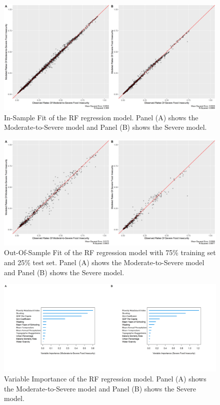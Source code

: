 \documentclass{article}
\begin{document}

\begin{figure}[H]
  \centering
  \includegraphics[width=\linewidth]{img/model/in-sample_rf.png}
  \caption{In-Sample Fit of the RF regression model. Panel (A) shows the Moderate-to-Severe model and Panel (B) shows the Severe model.}
  \label{fig:rf_in-sample}
\end{figure}

\begin{figure}[H]
  \centering
  \includegraphics[width=\linewidth]{img/model/out-sample_rf.png}
  \caption{Out-Of-Sample Fit of the RF regression model with 75\% training set and 25\% test set. Panel (A) shows the Moderate-to-Severe model and Panel (B) shows the Severe model.}
  \label{fig:rf_out-sample}
\end{figure}


\begin{figure}[H]
  \centering
  \includegraphics[width=\linewidth]{img/model/vimp_rf.png}
  \caption{Variable Importance of the RF regression model. Panel (A) shows the Moderate-to-Severe model and Panel (B) shows the Severe model.}
  \label{fig:rf_vimp}
\end{figure}
\end{document}
